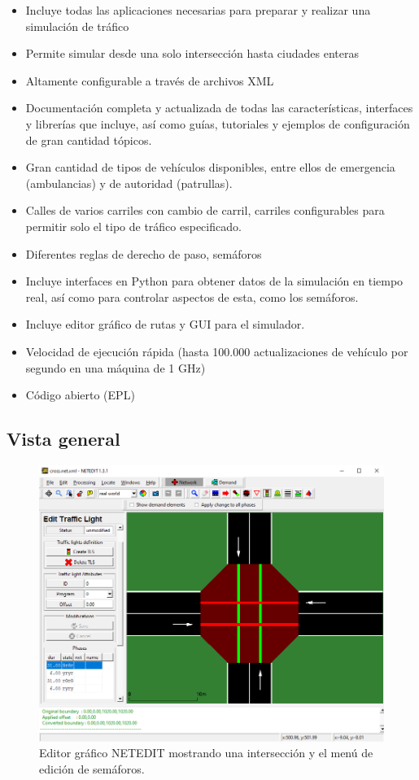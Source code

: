 \begin{itemize}
\tightlist
\item
  Incluye todas las aplicaciones necesarias para preparar y realizar una
  simulación de tráfico
\item
  Permite simular desde una solo intersección hasta ciudades enteras
\item
  Altamente configurable a través de archivos XML
\item
  Documentación completa y actualizada de todas las características,
  interfaces y librerías que incluye, así como guías, tutoriales y
  ejemplos de configuración de gran cantidad tópicos.
\item
  Gran cantidad de tipos de vehículos disponibles, entre ellos de
  emergencia (ambulancias) y de autoridad (patrullas).
\item
  Calles de varios carriles con cambio de carril, carriles configurables
  para permitir solo el tipo de tráfico especificado.
\item
  Diferentes reglas de derecho de paso, semáforos
\item
  Incluye interfaces en Python para obtener datos de la simulación en
  tiempo real, así como para controlar aspectos de esta, como los
  semáforos.
\item
  Incluye editor gráfico de rutas y GUI para el simulador.
\item
  Velocidad de ejecución rápida (hasta 100.000 actualizaciones de
  vehículo por segundo en una máquina de 1 GHz)
\item
  Código abierto (EPL)
\end{itemize}

\hypertarget{vista-general}{%
\subsection{Vista general}\label{vista-general}}

\begin{figure}[h]
    \centering
    \includegraphics[width=\textwidth]{sumo/1cb8aa292f0be15b402ccd4f098f53e0.png}
    \caption{Editor gráfico NETEDIT mostrando una intersección y el menú de edición de semáforos.}
    \label{fig:netedit1}
\end{figure}

